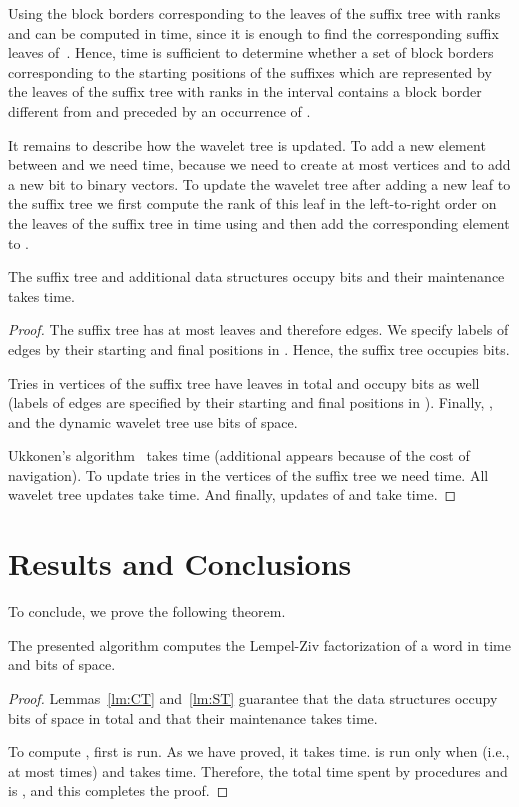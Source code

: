 \documentclass[10pt]{llncs}
\begin{document}
Using  the block borders corresponding to the leaves of the suffix tree with ranks  and  can be computed in  time, since it is enough to find the corresponding suffix leaves of~. Hence,  time is sufficient to determine whether a set of block borders corresponding to the starting positions of the suffixes which are represented by the leaves of the suffix tree with ranks in the interval  contains a block border different from  and preceded by an occurrence of .

It remains to describe how the wavelet tree is updated. To add a new element between  and  we need  time, because we need to create at most  vertices and to add a new bit to  binary vectors. To update the wavelet tree after adding a new leaf to the suffix tree we first compute the rank of this leaf in the left-to-right order on the leaves of the suffix tree in  time using  and then add the corresponding element to .

\begin{lemma}
\label{lm:ST}
The suffix tree and additional data structures occupy  bits and their maintenance takes  time.
\end{lemma}
\begin{proof}
The suffix tree has at most  leaves and therefore  edges. We specify labels of edges by their starting and final positions in . Hence, the suffix tree occupies  bits.

Tries in vertices of the suffix tree have  leaves in total and occupy  bits as well (labels of edges are specified by their starting and final positions in ). Finally, ,  and the dynamic wavelet tree use  bits of space.

Ukkonen's algorithm~\cite{ukkonen:on-line} takes  time (additional  appears because of the cost of navigation). To update tries in the vertices of the suffix tree we need  time. All wavelet tree updates take  time. And finally, updates of  and  take  time.
\end{proof}

\section{Results and Conclusions}
To conclude, we prove the following theorem. 

\begin{theorem}
  The presented algorithm computes the Lempel-Ziv factorization of a word  in  time and  bits of space.
\end{theorem}
\begin{proof}
Lemmas~\ref{lm:CT} and~\ref{lm:ST} guarantee that the data structures occupy  bits of space in total and that their maintenance takes  time.

To compute , first  is run. As we have proved, it takes  time.  is run only when  (i.e., at most  times) and takes  time. Therefore, the total time spent by procedures  and  is , and this completes the proof.
\end{proof}
\end{document}
